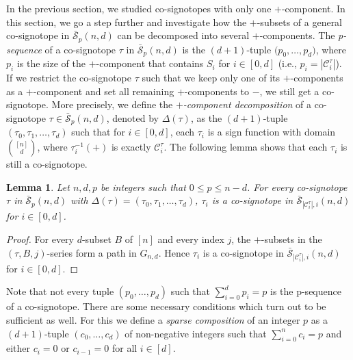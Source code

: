 \documentclass[a4paper,11pt]{amsart}
\newtheorem{lemma}[theorem]{Lemma}
\newcommand{\binnd}{\binom{[n]}{d}}
\newcommand{\C}{\mathcal{C}}
\newcommand{\calS}{\mathcal{S}}
\newcommand{\defi}[1]{\textcolor{defblue}{\emph{#1}}}
\begin{document}
In the previous section, we studied co-signotopes with only one $+$-component. In this section, we go a step further and investigate how the $+$-subsets of a general co-signotope in $\bar{\calS}_{p}(n,d)$ can be decomposed into several $+$-components. 
The \defi{p-sequence} of a co-signotope $\tau$ in $\bar{\calS}_{p}(n,d)$ is the $(d+1)$-tuple $\big(p_0, \dots, p_d)$, where $p_i$ is the size of the $+$-component that contains $S_i$ for $i \in [0,d]$ (i.e., $p_i = |\C^{\tau}_i|$).
If we restrict the co-signotope $\tau$ such that we keep only one of its $+$-components as a $+$-component and set all remaining $+$-components to $-$, we still get a co-signotope.
More precisely, we define the \defi{$+$-component decomposition} of a co-signotope $\tau \in \bar{\calS}_{p}(n,d)$, denoted by $\Delta(\tau)$,
as the $(d+1)$-tuple $(\tau_0,\tau_1,\dots,\tau_d)$ such that for $i \in [0,d]$, each $\tau_i$ is a sign function with domain $\binnd$, where $\tau_i^{-1}(+)$ is exactly $\C^{\tau}_i$.
The following lemma shows that each $\tau_i$ is still a co-signotope. 

\begin{lemma}
\label{lem:decomp}
	Let $n,d,p$ be integers such that $0 \leq p \leq n-d$.
	For every co-signotope $\tau$ in $\bar{\calS}_{p}(n,d)$ with $\Delta(\tau) = (\tau_0,\tau_1,\dots,\tau_d)$, $\tau_i$ is a co-signotope in $\bar{\calS}_{|\C^{\tau}_i|,i}(n,d)$ for $i \in [0,d]$.
\end{lemma} 
\begin{proof}
	For every $d$-subset $B$ of $[n]$ and every index $j$, the $+$-subsets in the $(\tau,B,j)$-series form a path in $G_{n,d}$. Hence $\tau_i$ is a co-signotope in $\bar{\calS}_{|\C^{\tau}_i|,i}(n,d)$ for $i \in [0,d]$.
\end{proof}

Note that not every tuple $(p_0, \dots, p_d)$ such that $\sum^d_{i=0} p_i = p$ is the p-sequence of a co-signotope. 
There are some necessary conditions which turn out to be sufficient as well. For this we define a \defi{sparse composition} of an integer $p$ as a $(d+1)$-tuple $(c_0, \dots, c_d)$ of non-negative integers such that $\sum^n_{i=0} c_i = p$ and either $c_i=0$ or $c_{i-1}=0$ for all $i \in [d]$.
\end{document}
